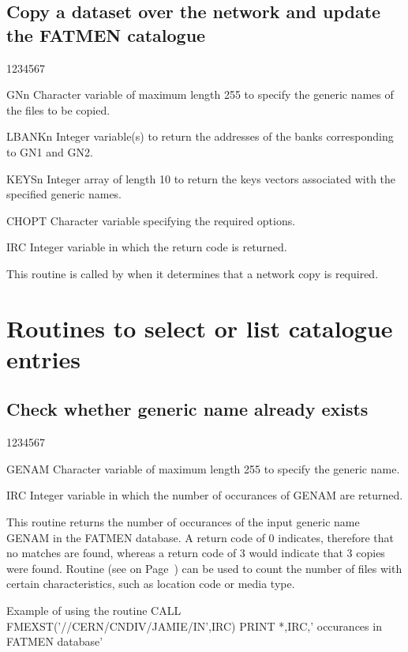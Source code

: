 \subsection{Copy a dataset over the network and update the FATMEN catalogue}
\begin{DLtt}{1234567}
\item[GNn]
Character variable of maximum length 255 to specify the generic names
of the files to be copied.
\item[LBANKn]
Integer variable(s) to return the addresses of the banks
corresponding to GN1 and GN2.
\item[KEYSn]
Integer array of length 10 to return the keys vectors associated
with the specified generic names.
\item[CHOPT]
Character variable specifying the required options.
\item[IRC]
Integer variable in which the return code is returned.
\end{DLtt}

This routine is called by  when it determines that a
network copy is required.
\section{Routines to select or list catalogue entries}
\subsection{Check whether generic name already exists}
\begin{DLtt}{1234567}
\item[GENAM]
Character variable of maximum length 255 to specify the generic name.
\item[IRC]
Integer variable in which the number of occurances of GENAM
are returned.
\end{DLtt}
\par
This routine returns the number of occurances of the input generic name
GENAM in the FATMEN database. A return code of 0 indicates, therefore
that no matches are found, whereas a return code of 3 would indicate
that 3 copies were found.
Routine  (see on Page~\pageref{FMSELK}) can be used
to count the number of files with certain characteristics, such
as location code or media type.
\begin{XMPt}{Example of using the \protect{} routine}
      CALL FMEXST('//CERN/CNDIV/JAMIE/IN',IRC)
      PRINT *,IRC,' occurances in FATMEN database'
\end{XMPt}

